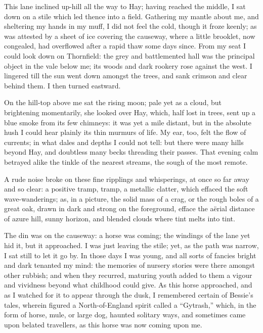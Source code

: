 This lane inclined up-hill all the way to Hay; having reached the
middle, I sat down on a stile which led thence into a field. Gathering
my mantle about me, and sheltering my hands in my muff, I did not feel
the cold, though it froze keenly; as was attested by a sheet of ice
covering the causeway, where a little brooklet, now congealed, had
overflowed after a rapid thaw some days since. From my seat I could
look down on Thornfield: the grey and battlemented hall was the
principal object in the vale below me; its woods and dark rookery rose
against the west. I lingered till the sun went down amongst the trees,
and sank crimson and clear behind them. I then turned eastward.

On the hill-top above me sat the rising moon; pale yet as a cloud, but
brightening momentarily, she looked over Hay, which, half lost in trees,
sent up a blue smoke from its few chimneys: it was yet a mile distant,
but in the absolute hush I could hear plainly its thin murmurs of life.
My ear, too, felt the flow of currents; in what dales and depths I could
not tell: but there were many hills beyond Hay, and doubtless many becks
threading their passes. That evening calm betrayed alike the tinkle of
the nearest streams, the sough of the most remote.

A rude noise broke on these fine ripplings and whisperings, at once so
far away and so clear: a positive tramp, tramp, a metallic clatter,
which effaced the soft wave-wanderings; as, in a picture, the solid mass
of a crag, or the rough boles of a great oak, drawn in dark and strong
on the foreground, efface the aërial distance of azure hill, sunny
horizon, and blended clouds where tint melts into tint.

The din was on the causeway: a horse was coming; the windings of the
lane yet hid it, but it approached. I was just leaving the stile; yet,
as the path was narrow, I sat still to let it go by. In those days I
was young, and all sorts of fancies bright and dark tenanted my mind:
the memories of nursery stories were there amongst other rubbish; and
when they recurred, maturing youth added to them a vigour and vividness
beyond what childhood could give. As this horse approached, and as I
watched for it to appear through the dusk, I remembered certain of
Bessie's tales, wherein figured a North-of-England spirit called a
\enquote{Gytrash,} which, in the form of horse, mule, or large dog,
haunted solitary ways, and sometimes came upon belated travellers, as
this horse was now coming upon me.


